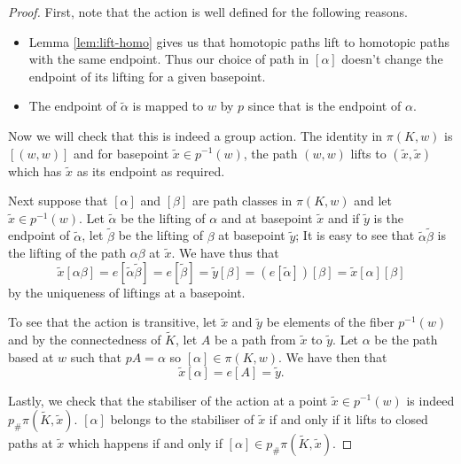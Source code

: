 \begin{proof}
  First, note that the action is well defined for the following reasons.
  \begin{itemize}
  \item Lemma \ref{lem:lift-homo} gives us that homotopic paths lift to homotopic paths with the same endpoint. Thus our choice of path in $[\alpha]$ doesn't change the endpoint of its lifting for a given basepoint.
  \item The endpoint of $\tilde{\alpha}$ is mapped to $w$ by $p$ since that is the endpoint of $\alpha$.
  \end{itemize}
  
  Now we will check that this is indeed a group action. The identity in $\pi(K,w)$ is $[(w,w)]$ and for basepoint $\tilde{x} \in p^{-1}(w)$, the path $(w,w)$ lifts to $(\tilde{x},\tilde{x})$ which has $\tilde{x}$ as its endpoint as required.

  Next suppose that $[\alpha]$ and $[\beta]$ are path classes in $\pi(K,w)$ and let $\tilde{x} \in p^{-1}(w)$. Let $\tilde{\alpha}$ be the lifting of $\alpha$ and at basepoint $\tilde{x}$ and if $\tilde{y}$ is the endpoint of $\tilde{\alpha}$, let $\tilde{\beta}$ be the lifting of $\beta$ at basepoint $\tilde{y}$; It is easy to see that $\tilde{\alpha}\tilde{\beta}$ is the lifting of the path $\alpha\beta$ at $\tilde{x}$. We have thus that
  \begin{equation*}
    \tilde{x}[\alpha\beta] = e[\tilde{\alpha}\tilde{\beta}] = e[\tilde{\beta}] = \tilde{y}[\beta] = (e[\tilde{\alpha}])[\beta] = \tilde{x}[\alpha][\beta]
  \end{equation*}
  by the uniqueness of liftings at a basepoint.

  To see that the action is transitive, let $\tilde{x}$ and $\tilde{y}$ be elements of the fiber $p^{-1}(w)$ and by the connectedness of $\tilde{K}$, let $A$ be a path from $\tilde{x}$ to $\tilde{y}$. Let $\alpha$ be the path based at $w$ such that $pA = \alpha$ so $[\alpha] \in \pi(K,w)$. We have then that
  \begin{equation*}
    \tilde{x}[\alpha] = e[A] = \tilde{y}.
  \end{equation*}

  Lastly, we check that the stabiliser of the action at a point $\tilde{x} \in p^{-1}(w)$ is indeed $p_{\#}\pi(\tilde{K},\tilde{x})$. $[\alpha]$ belongs to the stabiliser of $\tilde{x}$ if and only if it lifts to closed paths at $\tilde{x}$ which happens if and only if $[\alpha] \in p_{\#}\pi(\tilde{K},\tilde{x})$.
\end{proof}

